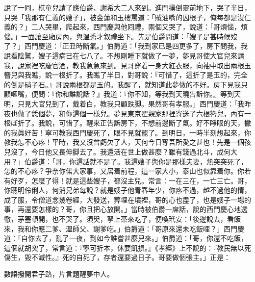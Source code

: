 說了一囘，棋童兒請了應伯爵、謝希大二人來到。進門撲倒靈前地下，{}哭了半日，只哭「我那有仁義的嫂子」，{}被金蓮和玉樓罵道：「賊油嘴的囚根子，俺每都是沒仁義的？」二人哭畢，爬起來，西門慶與他囘禮，兩個又哭了，說道：「哥煩惱，煩惱。」一面讓至廂房內，與溫秀才叙禮坐下。先是伯爵問道：「嫂子是甚時候歿了？」西門慶道：「正丑時斷氣。」伯爵道：「我到家已是四更多了，房下問我，我說看陰騭，嫂子這病已在七八了。不想剛睡下就做了一夢，{}夢見哥使大官兒來請我，說家裡吃慶官酒，教我急急來到。見哥穿着一身大紅衣服，向袖中取出兩根玉簪兒與我瞧，說一根折了。我瞧了半日，對哥說：『可惜了，這折了是玉的，完全的倒是硝子石。』{}哥說兩根都是玉的。{}我醒了，就知道此夢做的不好。房下見我只顧咂嘴，便問：『你和誰說話？』我道：『你不知，等我到天曉告訴你。』等到天明，只見大官兒到了，戴着白，教我只顧跌脚。{}果然哥有孝服。」西門慶道：「我昨夜也做了恁個夢，和你這個一樣兒。夢見東京翟親家那裡寄送了六根簪兒，內有一根ぼ折了。我說，可惜了。醒來正告訴房下，不想前邊斷了氣。好不睜眼的天，{}撇的我眞好苦！寧可教我西門慶死了，眼不見就罷了。到明日，一時半刻想起來，你教我怎不心疼！平時，我又沒曾虧欠了人，{}天何今日奪吾所愛之甚也！先是一個孩兒沒了，今日他又長伸脚去了。我還活在世上做甚麼？雖有錢過北斗，成何大用？」伯爵道：「哥，你這話就不是了。我這嫂子與你是那樣夫妻，熱突突死了，怎的不心疼？爭奈你偌大家事，又居着前程，這一家大小，泰山也似靠着你。你若有好歹，怎麼了得！就是這些嫂子，都沒主兒。常言：一在三在，一亡三亡。哥，你聰明伶俐人，何消兄弟每說？就是嫂子他青春年少，你疼不過，越不過他的情，成了服，令僧道念幾卷經，大發送，葬埋在墳裡，哥的心也盡了，也是嫂子一場的事，再還要怎樣的？哥，你且把心放開。」{}當時被伯爵一席話，說的西門慶心地透徹，茅塞頓開，也不哭了。須臾，拏上茶來吃了，便喚玳安：「後邊說去，看飯來，我和你應二爹、溫師父、謝爹吃。」伯爵道：「哥原來還未吃飯哩？」西門慶道：「自你去了，亂了一夜，到如今誰嘗甚麼兒來。」伯爵道：「哥，你還不吃飯，這個就胡突了，常言道：『寧可折本，休要飢損。』《孝經》上不說的：『教民無以死傷生，毀不滅性。』{}死的自死了，存者還要過日子。哥要做個張主。」正是：

\begin{myquote} 
數語撥開君子路，片言題醒夢中人。
\end{myquote} 

